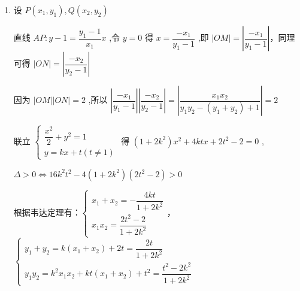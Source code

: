 \begin{enumerate}
\begin{jieda}
\begin{enumerate}
        因为椭圆经过点 $A\left( {0,1}\right)$ ,所以 $b = 1$ ,所以 ${a}^{2} = {b}^{2} + {c}^{2} = 2$ ,故椭圆的方程为 $\dfrac{{x}^{2}}{2} + {y}^{2} = 1$ .
        \item 设 $P\left( {{x}_{1},{y}_{1}}\right) ,Q\left( {{x}_{2},{y}_{2}}\right)$

        直线 ${AP} : y - 1 = \dfrac{{y}_{1} - 1}{{x}_{1}}x$ ,令 $y = 0$ 得 $x = \dfrac{-{x}_{1}}{{y}_{1} - 1}$ ,即 $\left| {OM}\right|  = \left| \dfrac{-{x}_{1}}{{y}_{1} - 1}\right|$，同理可得 $\left| {ON}\right|  = \left| \dfrac{-{x}_{2}}{{y}_{2} - 1}\right|$

        因为 $\left| {OM}\right| \left| {ON}\right|  = 2$ ,所以 $\left| \dfrac{-{x}_{1}}{{y}_{1} - 1}\right| \left| \dfrac{-{x}_{2}}{{y}_{2} - 1}\right|  = \left| \dfrac{{x}_{1}{x}_{2}}{{y}_{1}{y}_{2} - \left( {{y}_{1} + {y}_{2}}\right)  + 1}\right|  = 2$

        联立 $\left\{  \begin{matrix} \dfrac{{x}^{2}}{2} + {y}^{2} = 1 \\  y = {kx} + t\left( {t \neq  1}\right)  \end{matrix}\right.$ 得 $\left( {1 + 2{k}^{2}}\right) {x}^{2} + {4ktx} + 2{t}^{2} - 2 = 0$ ,

        $\Delta  > 0 \Longleftrightarrow 16k^2t^2-4(1+2k^2)(2t^2-2) > 0$
        
        根据韦达定理有：$\left\{\begin{array}{l}
             {x}_{1} + {x}_{2} =  - \dfrac{4kt}{1 + 2{k}^{2}}  \\
             {x}_{1}{x}_{2} = \dfrac{2{t}^{2} - 2}{1 + 2{k}^{2}}
        \end{array}\right.$，$\left\{\begin{array}{l}
             {y}_{1} + {y}_{2} = k\left( {{x}_{1} + {x}_{2}}\right)  + {2t} = \dfrac{2t}{1 + 2{k}^{2}} \\
             {y}_{1}{y}_{2} = {k}^{2}{x}_{1}{x}_{2} + {kt}\left( {{x}_{1} + {x}_{2}}\right)  + {t}^{2} = \dfrac{{t}^{2} - 2{k}^{2}}{1 + 2{k}^{2}}
        \end{array}\right.$


\end{enumerate}
\end{jieda}
\end{enumerate}
